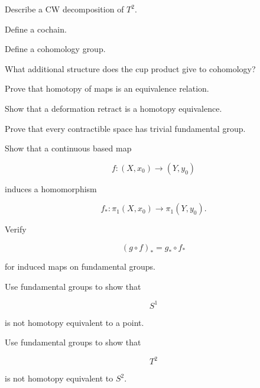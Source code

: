 \begin{exercise}[2]
Describe a CW decomposition of \(T^2\).
\end{exercise}

\begin{exercise}[2]
Define a cochain.
\end{exercise}

\begin{exercise}[2]
Define a cohomology group.
\end{exercise}

\begin{exercise}[2]
What additional structure does the cup product give to cohomology?
\end{exercise}

\begin{exercise}[3]
Prove that homotopy of maps is an equivalence relation.
\end{exercise}

\begin{exercise}[3]
Show that a deformation retract is a homotopy equivalence.
\end{exercise}

\begin{exercise}[3]
Prove that every contractible space has trivial fundamental group.
\end{exercise}

\begin{exercise}[3]
Show that a continuous based map

\[
f:(X,x_0)\to(Y,y_0)
\]

induces a homomorphism

\[
f_*:\pi_1(X,x_0)\to\pi_1(Y,y_0).
\]
\end{exercise}

\begin{exercise}[3]
Verify

\[
(g\circ f)_*=g_*\circ f_*
\]

for induced maps on fundamental groups.
\end{exercise}

\begin{exercise}[3]
Use fundamental groups to show that

\[
S^1
\]

is not homotopy equivalent to a point.
\end{exercise}

\begin{exercise}[3]
Use fundamental groups to show that

\[
T^2
\]

is not homotopy equivalent to \(S^2\).
\end{exercise}

